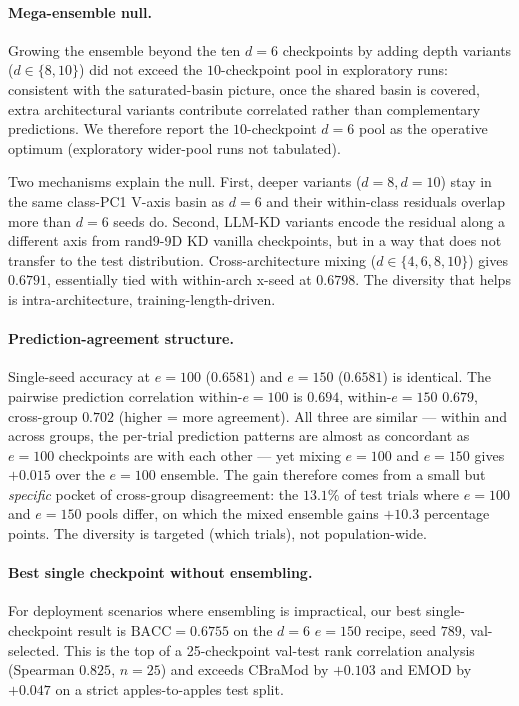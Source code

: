 \paragraph{Mega-ensemble null.} Growing the ensemble beyond the ten
$d{=}6$ checkpoints by adding depth variants ($d{\in}\{8,10\}$) did not
exceed the $10$-checkpoint pool in exploratory runs: consistent with the
saturated-basin picture, once the shared basin is covered, extra
architectural variants contribute correlated rather than complementary
predictions. We therefore report the $10$-checkpoint $d{=}6$ pool as the
operative optimum (exploratory wider-pool runs not tabulated).


Two mechanisms explain the null. First, deeper variants ($d{=}8, d{=}10$)
stay in the same class-PC1 V-axis basin as $d{=}6$ and their within-class
residuals overlap more than $d{=}6$ seeds do. Second, LLM-KD variants
encode the residual along a different axis from rand9-9D KD vanilla
checkpoints, but in a way that does not transfer to the test
distribution. Cross-architecture mixing ($d \in \{4, 6, 8, 10\}$) gives
$0.6791$, essentially tied with within-arch x-seed at $0.6798$.  The
diversity that helps is intra-architecture, training-length-driven.

\paragraph{Prediction-agreement structure.}
Single-seed accuracy at $e{=}100$ ($0.6581$) and $e{=}150$ ($0.6581$) is
identical. The pairwise prediction correlation within-$e{=}100$ is
$0.694$, within-$e{=}150$ $0.679$, cross-group $0.702$ (higher = more
agreement). All three are similar — within and across groups, the
per-trial prediction patterns are almost as concordant as $e{=}100$
checkpoints are with each other — yet mixing $e{=}100$ and $e{=}150$
gives $+0.015$ over the $e{=}100$ ensemble. The gain therefore comes from a
small but \emph{specific} pocket of cross-group disagreement: the
$13.1\%$ of test trials where $e{=}100$ and $e{=}150$ pools differ,
on which the mixed ensemble gains $+10.3$ percentage points. The
diversity is targeted (which trials), not population-wide.

\paragraph{Best single checkpoint without ensembling.}
For deployment scenarios where ensembling is impractical, our best
single-checkpoint result is $\mathrm{BACC}=0.6755$ on the $d{=}6$
$e{=}150$ recipe, seed $789$, val-selected. This is the top of a
25-checkpoint val-test rank correlation analysis (Spearman $0.825$,
$n=25$) and exceeds CBraMod by $+0.103$ and EMOD by $+0.047$ on a
strict apples-to-apples test split.


